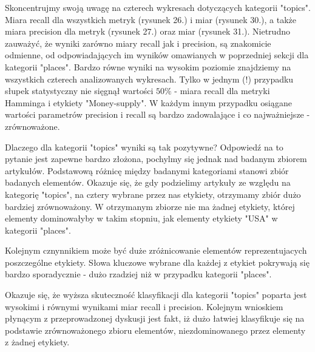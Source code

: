\documentclass{classrep}
\begin{document}
Skoncentrujmy swoją uwagę na czterech wykresach dotyczących kategorii "topics". Miara recall dla wszystkich metryk (rysunek 26.) i miar (rysunek 30.), a także miara precision dla metryk (rysunek 27.) oraz miar (rysunek 31.). Nietrudno zauważyć, że wyniki zarówno miary recall jak i precision, są znakomicie odmienne, od odpowiadających im wyników omawianych w poprzedniej sekcji dla kategorii "places". Bardzo równe wyniki na wysokim poziomie znajdziemy na wszystkich czterech analizowanych wykresach. Tylko w jednym (!) przypadku słupek statystyczny nie sięgnął wartości $50\%$ - miara recall dla metryki Hamminga i etykiety "Money-supply". W każdym innym przypadku osiągane wartości parametrów precision i recall są bardzo zadowalające i co najważniejsze - zrównoważone.\newline

Dlaczego dla kategorii "topics" wyniki są tak pozytywne? Odpowiedź na to pytanie jest zapewne bardzo złożona, pochylmy się jednak nad badanym zbiorem artykułów. Podstawową różnicę między badanymi kategoriami stanowi zbiór badanych elementów. Okazuje się, że gdy podzielimy artykuły ze względu na kategorię "topics", na cztery wybrane przez nas etykiety, otrzymamy zbiór dużo bardziej zrównoważony. W otrzymanym zbiorze nie ma żadnej etykiety, której elementy dominowałyby w takim stopniu, jak elementy etykiety "USA" w kategorii "places".\newline

Kolejnym cznynnikiem może być duże zróżnicowanie elementów reprezentujacych poszczególne etykiety. Słowa kluczowe wybrane dla każdej z etykiet pokrywają się bardzo sporadycznie - dużo rzadziej niż w przypadku kategorii "places".\newline

Okazuje się, że wyższa skuteczność klasyfikacji dla kategorii "topics" poparta jest wysokimi i równymi wynikami miar recall i precision. Kolejnym wnioskiem płynącym z przeprowadzonej dyskusji jest fakt, iż dużo łatwiej klasyfikuje się na podstawie zrównoważonego zbioru elementów, niezdominowanego przez elementy z żadnej etykiety.
\end{document}
